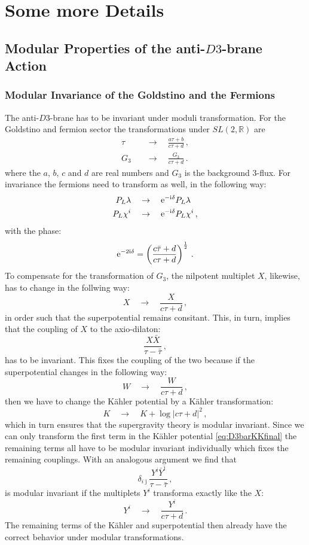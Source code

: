 \documentclass[12pt]{report}
\newcommand{\be}{\begin{equation}}
\newcommand{\ee}{\end{equation}}
\newcommand{\bea}{\begin{equation}\begin{aligned}}
\newcommand{\eea}{\end{aligned}\end{equation}}
\def\rmi{{\rm i}}
\def\rme{{\rm e}}
\def\jb{{\bar \jmath}}
\begin{document}
\appendix
\chapter{Some more Details}

\section{Modular Properties of the anti-$D3$-brane Action}
\label{app:modinv}
\subsection{Modular Invariance of the Goldstino and the Fermions}
The anti-$D3$-brane has to be invariant under moduli transformation. For the Goldstino and fermion sector the transformations under $SL(2,\mathbb{R})$ are 
\bea 
\tau \quad &\to \quad \frac{a\tau + b}{c \tau + d}\,,\\
G_3 \quad &\to \quad \frac{G_3}{c\tau + d}\,.
\eea 
where the $a$, $b$, $c$ and $d$ are real numbers and $G_3$ is the background 3-flux. For invariance the fermions need to transform as well, in the following way:
\bea 
P_L \lambda \quad &\to \quad \rme^{-\rmi \delta} P_L \lambda \\
P_L \chi^i \quad &\to \quad \rme^{-\rmi \delta} P_L \chi^i\,,
\eea 
with the phase:
\be 
\rme^{-2\rmi\delta} = \left( \frac{c\bar{\tau}+d}{c \tau + d} \right)^{\frac{1}{2}}\,.
\ee
To compensate for the transformation of $G_3$, the nilpotent multiplet $X$, likewise, has to change in the follwing way:
\be 
X \quad \to \quad \frac{X}{c\tau + d}\,,
\ee
in order such that the superpotential remains consitant. This, in turn, implies that the coupling of $X$ to the axio-dilaton:
\be 
\frac{X \bar{X}}{\tau-\bar{\tau}}\,,
\ee
has to be invariant. This fixes the coupling of the two because if the superpotential changes in the following way:
\be 
W \quad \to \quad \frac{W}{c\tau + d}\,,
\ee
then we have to change the Kähler potential by a Kähler transformation:
\be 
K \quad \to \quad K + \log | c \tau + d |^2\,,
\ee
which in turn ensures that the supergravity theory is modular invariant. Since we can only transform the first term in the Kähler potential \eqref{eq:D3barKKfinal} the remaining terms all have to be modular invariant individually which fixes the remaining couplings. With an analogous argument we find that 
\be 
\delta_{i\jb} \frac{Y^i \bar{Y}^\jb}{\tau-\bar{\tau}}\,,
\ee
is modular invariant if the multiplets $Y^i$ transforma exactly like the $X$:
\be 
Y^i \quad \to \quad \frac{Y^i}{c\tau +d}\,.
\ee
The remaining terms of the Kähler and superpotential then already have the correct behavior under modular transformations.
\end{document}

